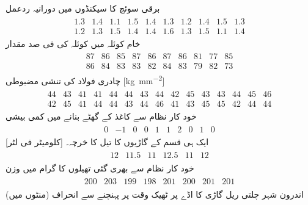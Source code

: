 \quad برقی سوئچ کا سیکنڈوں میں دورانیہ ردعمل 
\begin{align*}
\begin{array}{rrrrrrrrrr}
1.3&1.4&1.1&1.5&1.4&1.3&1.2&1.4&1.5&1.3\\
1.2&1.3&1.5&1.4&1.4&1.6&1.3&1.5&1.1&1.4
\end{array}
\end{align*}
\quad خام کوئلہ میں کوئلہ کی فی صد مقدار
\begin{align*}
\begin{array}{rrrrrrrrrr}
87&86&85&87&86&87&86&81&77&85\\
86&84&83&83&82&84&83&79&82&73
\end{array}
\end{align*}
\quad چادری فولاد کی تنشی مضبوطی [\si{\kilo\gram\per\milli\meter\squared}]
\begin{align*}
\begin{array}{rrrrrrrrrrrrrrr}
44&43&41&41&44&44&43&44&42&45&43&43&44&45&46\\
42&45&41&44&44&43&44&46&41&43&45&45&42&44&44
\end{array}
\end{align*}
\quad  خود کار نظام سے  کاغذ  کے گھٹے بنانے میں کمی بیشی
\begin{align*}
\begin{array}{rrrrrrrrrr}
0&-1&0&0&1&1&2&0&1&0
\end{array}
\end{align*}
\quad  ایک ہی قسم کے گاڑیوں کا تیل کا خرچہ۔  [کلومیٹر فی لٹر]  
\begin{align*}
\begin{array}{rrrrrr}
12& 11.5&11&12.5&11&12
\end{array}
\end{align*}
\quad  خود کار نظام سے بھری گئی تھیلوں کا گرام میں وزن
\begin{align*}
\begin{array}{rrrrrrrr}
200&203&199&198&201&200&201&201
\end{array}
\end{align*}
\quad  اندرون شہر چلتی ریل گاڑی کا اڈے پر ٹھیک وقت پر پہنچنے سے انحراف (منٹوں میں)
